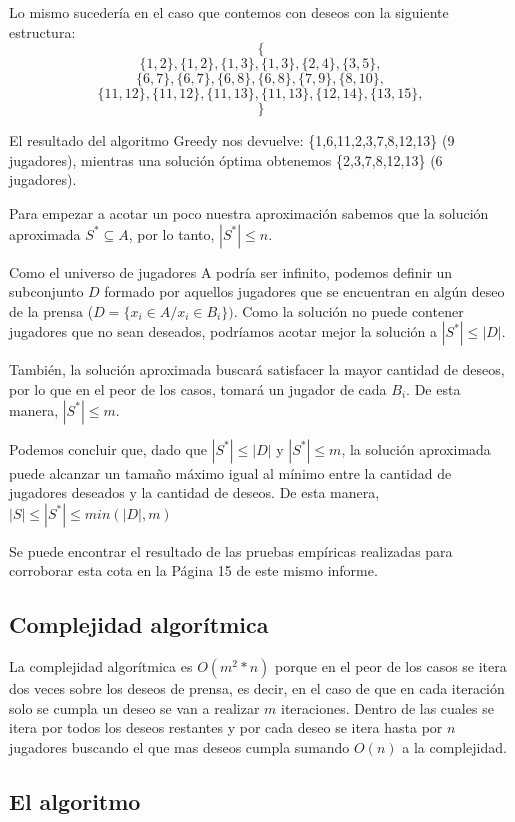 \documentclass{estilo}
\begin{document}
Lo mismo sucedería en el caso que contemos con deseos con la siguiente estructura:
\[\{\]
\[\{1,2\}, \{1,2\}, \{1,3\}, \{1,3\}, \{2,4\}, \{3,5\},\]
\[\{6,7\}, \{6,7\}, \{6,8\}, \{6,8\}, \{7,9\}, \{8,10\},\]
\[\{11,12\}, \{11,12\}, \{11,13\}, \{11,13\}, \{12,14\}, \{13,15\},\]
\[\}\]

El resultado del algoritmo Greedy nos devuelve: \{1,6,11,2,3,7,8,12,13\} (9 jugadores), mientras una solución óptima obtenemos \{2,3,7,8,12,13\} (6 jugadores).

Para empezar a acotar un poco nuestra aproximación sabemos que la solución aproximada $S^* \subseteq A$, por lo tanto, $|S^*| \le n$. 

Como el universo de jugadores A podría ser infinito, podemos definir un subconjunto $D$ formado por aquellos jugadores que se encuentran en algún deseo de la prensa  ($D = \{x_i \in A / x_i \in B_i\})$. Como la solución no puede contener jugadores que no sean deseados, podríamos acotar mejor la solución a $|S^*| \le |D|$.

También, la solución aproximada buscará satisfacer la mayor cantidad de deseos, por lo que en el peor de los casos, tomará un jugador de cada $B_i$. De esta manera, $|S^*| \le m$.

Podemos concluir que, dado que $|S^*| \le |D|$ y $|S^*| \le m$, la solución aproximada puede alcanzar un tamaño máximo igual al mínimo entre la cantidad de jugadores deseados y la cantidad de deseos. De esta manera, $|S| \le |S^*| \le min(|D|, m)$

Se puede encontrar el resultado de las pruebas empíricas realizadas para corroborar esta cota en la Página 15 de este mismo informe.
\subsection{Complejidad algorítmica}

La complejidad algorítmica es $O(m^2 * n)$ porque en el peor de los casos se itera dos veces sobre los deseos de prensa, es decir, en el caso de que en cada iteración solo se cumpla un deseo se van a realizar $m$ iteraciones. Dentro de las cuales se itera por todos los deseos restantes y por cada deseo se itera hasta por $n$ jugadores buscando el que mas deseos cumpla sumando $O(n)$ a la complejidad.

\newpage
\subsection{El algoritmo}
\end{document}

